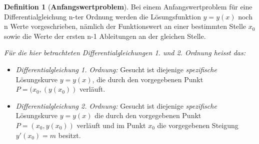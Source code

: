 \documentclass{article}
\theoremstyle{satz}
\theoremstyle{definition}
\newtheorem{definition}{Definition}
\begin{document}
\begin{tcolorbox}
\begin{definition}[\textbf{Anfangswertproblem}]
Bei einem Anfangswertproblem für eine Differentialgleichung n-ter Ordnung werden die Lösungsfunktion $y=y(x)$ noch n Werte vorgeschrieben, nämlich der Funktionswert an einer bestimmten Stelle $x_0$ sowie die Werte der ersten n-1 Ableitungen an der gleichen Stelle.

\textit{Für die hier betrachteten Differentialgleichungen 1. und 2. Ordnung heisst das:}
\begin{itemize}
\item {\textit{Differentialgleichung 1. Ordnung:} Gesucht ist diejenige \textit{spezifische} Lösungskurve $y=y(x)$, die durch den vorgegebenen Punkt $P=(x_0,(y(x_0))$ verläuft.} 
\item {\textit{Differentialgleichung 2. Ordnung:} Gesucht ist diejenige \textit{spezifische} Lösungskurve $y=y(x)$ die durch den vorgegebenen Punkt $P = (x_0, y(x_0))$ verläuft und im Punkt $x_0$ die vorgegebenen Steigung $y'(x_0) = m$ besitzt.}
\end{itemize}
\end{definition}	
\end{tcolorbox}
\end{document}
